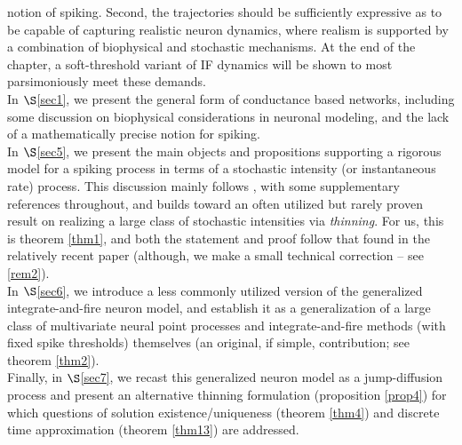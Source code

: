 \documentclass[12pt, oneside]{report}
\newcommand{\1}[1]{\mathbbm{1}_{\{#1\}}}
\theoremstyle{definition}
\begin{document}
notion of spiking. Second, the trajectories should be sufficiently expressive as
to be capable of capturing realistic neuron dynamics, where realism is supported
by a combination of biophysical and stochastic mechanisms. At the end of the chapter,
a soft-threshold variant of IF dynamics will be shown to most parsimoniously meet
these demands.\\[5pt]
\indent In $\S$\ref{sec1}, we present the general form of conductance based networks, including some discussion on
biophysical considerations in neuronal modeling, and the lack of a mathematically precise notion for spiking.\\[5pt]
\indent In $\S$\ref{sec5}, we present the main objects and propositions supporting a rigorous model for a spiking process in terms of a stochastic intensity (or instantaneous rate) process. This
discussion mainly follows \cite[ch.2,8]{Bremaud_1981}, with some supplementary references throughout, and builds toward an often utilized but rarely proven result
on realizing a large class of stochastic intensities via \textit{thinning}. For us, this is theorem \ref{thm1}, and both the statement and proof follow that found in
the relatively recent paper \cite[theorem B.11]{Chevallier_Caceres_Doumic_Reynaud_Bouret_2015} (although, we make a small technical correction -- see \ref{rem2}).\\[5pt]
\indent In $\S$\ref{sec6}, we introduce a less commonly utilized version of the generalized integrate-and-fire neuron model, and establish it as a generalization of a large class of multivariate neural point processes and
integrate-and-fire methods (with fixed spike thresholds) themselves (an original, if simple, contribution; see theorem \ref{thm2}).\\[5pt]
\indent Finally, in $\S$\ref{sec7}, we recast this generalized neuron model as a jump-diffusion process and present an alternative thinning formulation (proposition \ref{prop4}) for which questions of solution existence/uniqueness (theorem \ref{thm4}) and
discrete time approximation (theorem \ref{thm13}) are addressed. 
\end{document}
